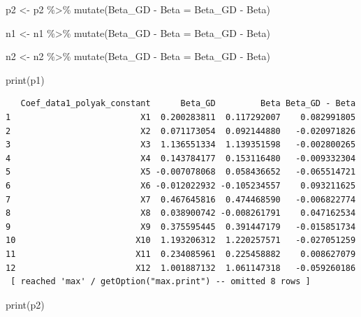 \documentclass[
  letterpaper,
  DIV=11,
  numbers=noendperiod]{scrartcl}
\newenvironment{Shaded}{\begin{snugshade}}{\end{snugshade}}
\newcommand{\AttributeTok}[1]{\textcolor[rgb]{0.40,0.45,0.13}{#1}}
\newcommand{\FunctionTok}[1]{\textcolor[rgb]{0.28,0.35,0.67}{#1}}
\newcommand{\NormalTok}[1]{\textcolor[rgb]{0.00,0.23,0.31}{#1}}
\newcommand{\OtherTok}[1]{\textcolor[rgb]{0.00,0.23,0.31}{#1}}
\newcommand{\SpecialCharTok}[1]{\textcolor[rgb]{0.37,0.37,0.37}{#1}}
\newcommand{\StringTok}[1]{\textcolor[rgb]{0.13,0.47,0.30}{#1}}
\begin{document}
\begin{Shaded}
\begin{Highlighting}[]
\NormalTok{p2 }\OtherTok{\textless{}{-}}\NormalTok{ p2 }\SpecialCharTok{\%\textgreater{}\%}
  \FunctionTok{mutate}\NormalTok{(}\StringTok{\textasciigrave{}}\AttributeTok{Beta\_GD {-} Beta}\StringTok{\textasciigrave{}} \OtherTok{=}\NormalTok{ Beta\_GD }\SpecialCharTok{{-}}\NormalTok{ Beta)}

\NormalTok{n1 }\OtherTok{\textless{}{-}}\NormalTok{ n1 }\SpecialCharTok{\%\textgreater{}\%}
  \FunctionTok{mutate}\NormalTok{(}\StringTok{\textasciigrave{}}\AttributeTok{Beta\_GD {-} Beta}\StringTok{\textasciigrave{}} \OtherTok{=}\NormalTok{ Beta\_GD }\SpecialCharTok{{-}}\NormalTok{ Beta)}

\NormalTok{n2 }\OtherTok{\textless{}{-}}\NormalTok{ n2 }\SpecialCharTok{\%\textgreater{}\%}
  \FunctionTok{mutate}\NormalTok{(}\StringTok{\textasciigrave{}}\AttributeTok{Beta\_GD {-} Beta}\StringTok{\textasciigrave{}} \OtherTok{=}\NormalTok{ Beta\_GD }\SpecialCharTok{{-}}\NormalTok{ Beta)}


\FunctionTok{print}\NormalTok{(p1)}
\end{Highlighting}
\end{Shaded}

\begin{verbatim}
   Coef_data1_polyak_constant      Beta_GD         Beta Beta_GD - Beta
1                          X1  0.200283811  0.117292007    0.082991805
2                          X2  0.071173054  0.092144880   -0.020971826
3                          X3  1.136551334  1.139351598   -0.002800265
4                          X4  0.143784177  0.153116480   -0.009332304
5                          X5 -0.007078068  0.058436652   -0.065514721
6                          X6 -0.012022932 -0.105234557    0.093211625
7                          X7  0.467645816  0.474468590   -0.006822774
8                          X8  0.038900742 -0.008261791    0.047162534
9                          X9  0.375595445  0.391447179   -0.015851734
10                        X10  1.193206312  1.220257571   -0.027051259
11                        X11  0.234085961  0.225458882    0.008627079
12                        X12  1.001887132  1.061147318   -0.059260186
 [ reached 'max' / getOption("max.print") -- omitted 8 rows ]
\end{verbatim}

\begin{Shaded}
\begin{Highlighting}[]
\FunctionTok{print}\NormalTok{(p2)}
\end{Highlighting}
\end{Shaded}
\end{document}
